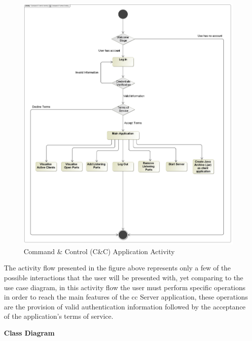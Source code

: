 \begin{figure}[h]
    \centering
    \includegraphics[width=1.0\textwidth, height=0.74\textheight]{images/command-control-activity.pdf}
    \captionsetup{justification=centering}
    \caption[Command \& Control Activity]{Command \& Control (C\&C) Application Activity}
    \label{fig:command-activity}
\end{figure}

The activity flow presented in the figure above represents only a few of the possible interactions
that the user will be presented with, yet comparing to the use case diagram, in this activity flow
the user must perform specific operations in order to reach the main features of the \acrfull{cc}
Server application, these operations are the provision of valid authentication information followed by the
acceptance of the application's terms of service.

\newpage

\noindent
\textbf{Class Diagram}

